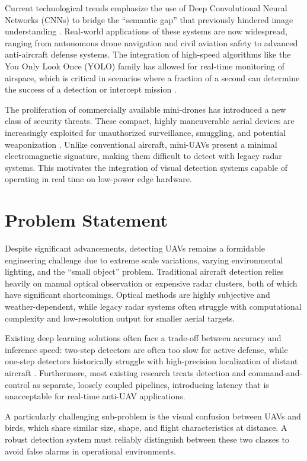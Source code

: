 \documentclass[12pt,a4paper]{report}
\begin{document}
Current technological trends emphasize the use of Deep Convolutional Neural Networks
(CNNs) to bridge the ``semantic gap'' that previously hindered image understanding
\cite{lecun2015deep}. Real-world applications of these systems are now widespread,
ranging from autonomous drone navigation and civil aviation safety to advanced
anti-aircraft defense systems. The integration of high-speed algorithms like the
You Only Look Once (YOLO) family has allowed for real-time monitoring of airspace,
which is critical in scenarios where a fraction of a second can determine the success
of a detection or intercept mission \cite{sapkota2025yolo26}.

The proliferation of commercially available mini-drones has introduced a new class
of security threats. These compact, highly maneuverable aerial devices are increasingly
exploited for unauthorized surveillance, smuggling, and potential weaponization
\cite{reis2023yolov8flying}. Unlike conventional aircraft, mini-UAVs present a
minimal electromagnetic signature, making them difficult to detect with legacy radar
systems. This motivates the integration of visual detection systems capable of
operating in real time on low-power edge hardware.

\section{Problem Statement}

Despite significant advancements, detecting UAVs remains a formidable engineering
challenge due to extreme scale variations, varying environmental lighting, and the
``small object'' problem. Traditional aircraft detection relies heavily on manual
optical observation or expensive radar clusters, both of which have significant
shortcomings. Optical methods are highly subjective and weather-dependent, while
legacy radar systems often struggle with computational complexity and low-resolution
output for smaller aerial targets.

Existing deep learning solutions often face a trade-off between accuracy and inference
speed: two-step detectors are often too slow for active defense, while one-step
detectors historically struggle with high-precision localization of distant aircraft
\cite{zhao2019object}. Furthermore, most existing research treats detection and
command-and-control as separate, loosely coupled pipelines, introducing latency that
is unacceptable for real-time anti-UAV applications.

A particularly challenging sub-problem is the visual confusion between UAVs and birds,
which share similar size, shape, and flight characteristics at distance. A robust
detection system must reliably distinguish between these two classes to avoid false
alarms in operational environments.
\end{document}
